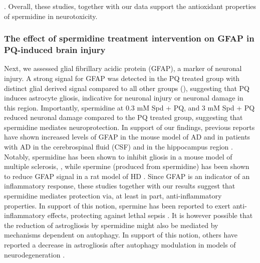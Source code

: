 \citep{Jamwal2016}. Overall, these studies, together with our data support the antioxidant properties of spermidine in neurotoxicity.

\subsubsection{The effect of spermidine treatment intervention on GFAP in PQ-induced brain injury}
Next, we assessed glial fibrillary acidic protein (GFAP), a marker of neuronal injury. A strong signal for GFAP was detected in the PQ treated group with distinct glial derived signal compared to all other groups (), suggesting that PQ induces astrocyte gliosis, indicative for neuronal injury or neuronal damage in this region. Importantly, spermidine at 0.3 mM Spd + PQ, and 3 mM Spd + PQ reduced neuronal damage compared to the PQ treated group, suggesting that spermidine mediates neuroprotection. In support of our findings, previous reports have shown increased levels of GFAP in the mouse model of AD \citep{Kamphuis2014,Kamphuis2012} and in patients with AD in the cerebrospinal fluid (CSF) \citep{Colangelo2014,Fukuyama2001,Ishiki2016} and in the hippocampus region \citep{Kamphuis2014}. Notably, spermidine has been shown to inhibit gliosis in a mouse model of multiple sclerosis, \citep{Guo2011}, while spermine (produced from spermidine) has been shown to reduce GFAP signal in a rat model of HD \citep{Velloso2009}. Since GFAP is an indicator of an inflammatory response, these studies together with our results suggest that spermidine mediates protection via, at least in part, anti-inflammatory properties. In support of this notion, spermine has been reported to exert anti-inflammatory effects, protecting against lethal sepsis \citep{Zhu2009}. It is however possible that the reduction of astrogliosis by spermidine might also be mediated by mechanisms dependent on autophagy. In support of this notion, others have reported a decrease in astrogliosis after autophagy modulation in models of neurodegeneration \citep{Castillo2013,Rodriguez-Navarro2010,Wang2012}. 

